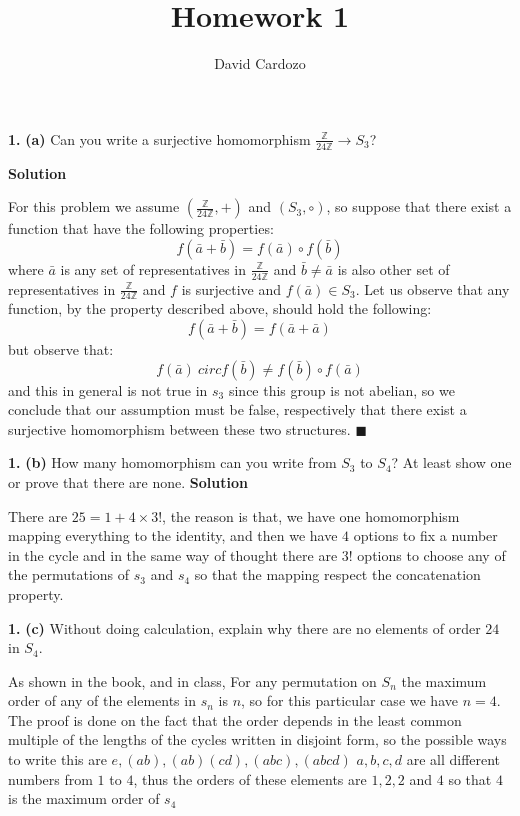 \documentclass[notitlepage]{report}
\author{David Cardozo}
\title{Homework 1}
\newcommand{\lrp}[1]{\left( #1 \right)}
\newcommand{\ZN}[1]{\frac{\mathbb{Z}}{#1 \mathbb{Z}}}
\begin{document}
\maketitle
\textbf{1.} 
\textbf{(a)}
Can you write a surjective homomorphism $\ZN{24} \rightarrow S_3$?

\textbf{Solution}
\begin{mdframed}[]
	For this problem we assume $\lrp{\ZN{24}, +}$ and $ \lrp{S_3, \circ}$, so suppose that there exist a function that have the following properties:
	\[ f(\bar{a} + \bar{b}) = f(\bar{a}) \circ f(\bar{b})  \] 	
	where $\bar{a} $ is any set of representatives in $\ZN{24}$ and $ \bar{b} \neq \bar{a}$ is also other set of representatives in $ \ZN{24} $ and $f$ is surjective and $f(\bar{a}) \in S_3$. Let us observe that any function, by the property described above, should hold the following:
	\[ f(\bar{a} + \bar{b}) = f(\bar{a} + \bar{a}) \]
	but observe that:
	\[ f(\bar{a}) \ circ f(\bar{b}) \neq f(\bar{b}) \circ f(\bar{a}) \]
	and this in general is not true in $s_3$ since this group is not abelian, so we conclude that our assumption must be false, respectively that there exist a surjective homomorphism between these two structures. $\blacksquare $
\end{mdframed}
\textbf{1.} 
\textbf{(b)}
How many homomorphism can you write from $S_3$ to $S_4$? At least show one or prove that there are none.
\textbf{Solution}
\begin{mdframed}[]
	There are $ 25 = 1 + 4 \times 3! $, the reason is that, we have one homomorphism mapping everything to the identity, and then we have $ 4 $ options to fix a number in the cycle and in the same way of thought there are $3!$ options to choose any of the permutations of $s_3$ and $s_4$  so that the mapping respect the concatenation property.
\end{mdframed}
\textbf{1.} 
\textbf{(c)} Without doing calculation, explain why there are no elements of order $24$ in $S_4$.
\begin{mdframed}[]
	As shown in the book, and in class, For any permutation on $S_n$ the maximum order of any of the elements in $s_n$ is $n$, so for this particular case we have $n = 4 $. The proof is done on the fact that the order depends in the least common multiple of the lengths of the cycles written in disjoint form, so the possible ways to write this are $e,(ab),(ab)(cd),(abc),(abcd)$ $a,b,c,d$ are all different numbers from $1 $ to $4$, thus the orders of these elements are $1,2,2$ and $4$ so that $4$ is the maximum order of $s_4$
\end{mdframed}
\end{document}
